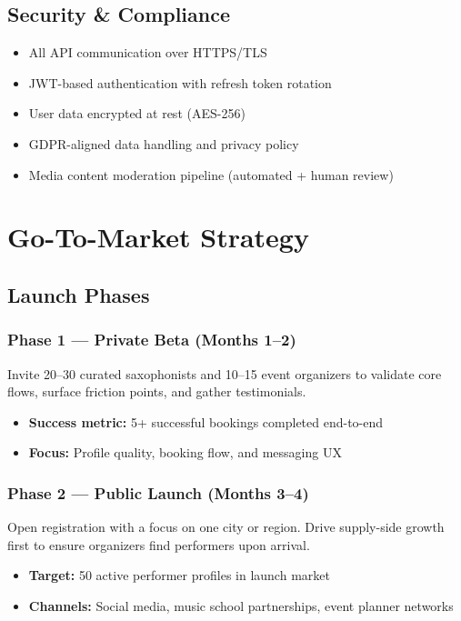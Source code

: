 \documentclass[11pt,a4paper]{article}
\begin{document}
\subsection{Security \& Compliance}
\begin{itemize}[leftmargin=1.5em]
  \item All API communication over HTTPS/TLS
  \item JWT-based authentication with refresh token rotation
  \item User data encrypted at rest (AES-256)
  \item GDPR-aligned data handling and privacy policy
  \item Media content moderation pipeline (automated + human review)
\end{itemize}

\section{Go-To-Market Strategy}

\subsection{Launch Phases}

\subsubsection{Phase 1 --- Private Beta (Months 1--2)}
Invite 20--30 curated saxophonists and 10--15 event organizers to validate core
flows, surface friction points, and gather testimonials.
\begin{itemize}[leftmargin=1.5em]
  \item \textbf{Success metric:} 5+ successful bookings completed end-to-end
  \item \textbf{Focus:} Profile quality, booking flow, and messaging UX
\end{itemize}

\subsubsection{Phase 2 --- Public Launch (Months 3--4)}
Open registration with a focus on one city or region. Drive supply-side growth
first to ensure organizers find performers upon arrival.
\begin{itemize}[leftmargin=1.5em]
  \item \textbf{Target:} 50 active performer profiles in launch market
  \item \textbf{Channels:} Social media, music school partnerships, event
        planner networks
\end{itemize}
\end{document}
